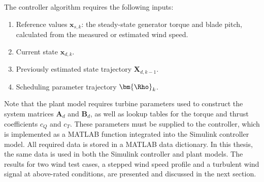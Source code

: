The controller algorithm requires the following inputs:
\begin{enumerate}
    \item Reference values \(\bm{x}_{s,k}\): the steady-state generator torque and blade pitch, calculated from the measured or estimated wind speed.
    \item Current state \(\bm{x}_{d,k}\).
    \item Previously estimated state trajectory \(\bm{X}_{d,k-1}\).
    \item Scheduling parameter trajectory \(\bm{\Rho}_k\).
\end{enumerate}

Note that the plant model requires turbine parameters used to construct the system matrices \(\bm{A}_d\) and \(\bm{B}_d\), as well as lookup tables for the torque and thrust coefficients \(c_Q\) and \(c_T\). These parameters must be supplied to the controller, which is implemented as a MATLAB function integrated into the Simulink controller model. All required data is stored in a MATLAB data dictionary. In this thesis, the same data is used in both the Simulink controller and plant models. The results for two wind test cases, a stepped wind speed profile and a turbulent wind signal at above-rated conditions, are presented and discussed in the next section.